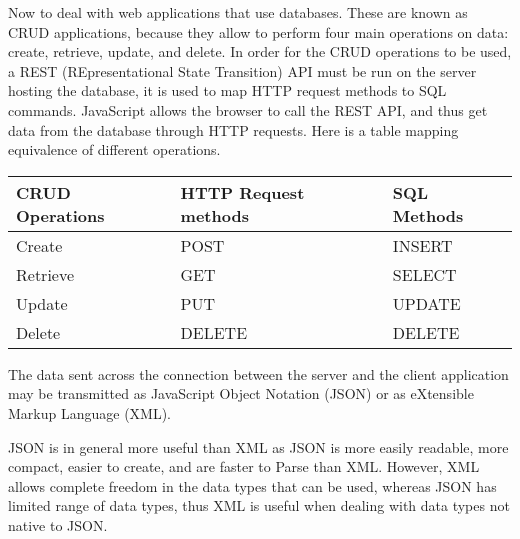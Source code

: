   Now to deal with web applications that use databases. These are known as CRUD applications, because they allow to perform four main operations on data: create, retrieve, update, and delete. In order for the CRUD operations to be used, a REST (REpresentational State Transition) API must be run on the server hosting the database, it is used to map HTTP request methods to SQL commands. JavaScript allows the browser to call the REST API, and thus get data from the database through HTTP requests. Here is a table mapping equivalence of different operations.
  
  \begin{table}[H]
  	\begin{tabular}{| l | l | l |}\hline
  		CRUD Operations 	& HTTP Request methods 	& SQL Methods \\\hline
  		Create				& POST					& INSERT \\\hline
  		Retrieve			& GET					& SELECT \\\hline
  		Update				& PUT					& UPDATE \\\hline
  		Delete				& DELETE				& DELETE \\\hline
  	\end{tabular}
  \end{table}
  
  The data sent across the connection between the server and the client application may be transmitted as JavaScript Object Notation (JSON) or as eXtensible Markup Language (XML).
  
  JSON is in general more useful than XML as JSON is more easily readable, more compact, easier to create, and are faster to Parse than XML. However, XML allows complete freedom in the data types that can be used, whereas JSON has limited range of data types, thus XML is useful when dealing with data types not native to JSON.
  
